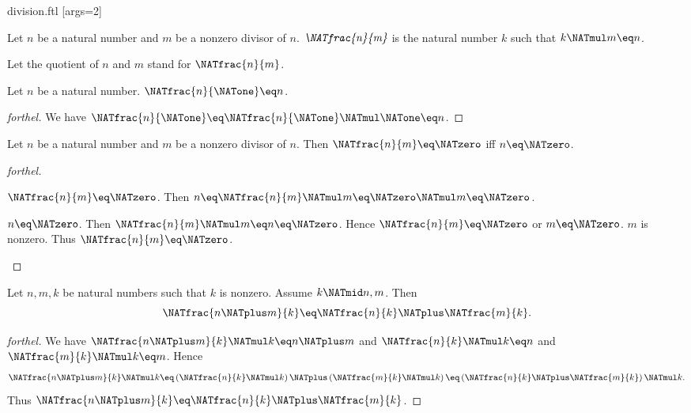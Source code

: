 \documentclass{naproche-library}
\begin{document}
\begin{smodule}[title=Division]{division.ftl}
[args=2]{}

\begin{definition}[forthel,id=ARITHMETIC_14_2313654268297915]
  Let $n$ be a natural number and $m$ be a nonzero divisor of $n$.
  $\emph{\NATfrac{n}{m}}$ is the natural number $k$ such that $k \NATmul m \eq n$.

  Let the quotient of $n$ and $m$ stand for $\NATfrac{n}{m}$.
\end{definition}

\begin{proposition}[forthel,id=ARITHMETIC_14_0843793254698710]
  Let $n$ be a natural number.
  $\NATfrac{n}{\NATone} \eq n$.
\end{proposition}
\begin{proof}[forthel]
  We have $\NATfrac{n}{\NATone}
    \eq \NATfrac{n}{\NATone} \NATmul \NATone
    \eq n$.
\end{proof}

\begin{proposition}[forthel,id=ARITHMETIC_14_1254235698632545]
  Let $n$ be a natural number and $m$ be a nonzero divisor of $n$.
  Then $\NATfrac{n}{m} \eq \NATzero$ iff $n \eq \NATzero$.
\end{proposition}
\begin{proof}[forthel]
  \begin{case}{$\NATfrac{n}{m} \eq \NATzero$.}
    Then $n
      \eq \NATfrac{n}{m} \NATmul m
      \eq \NATzero \NATmul m
      \eq \NATzero$.
  \end{case}

  \begin{case}{$n \eq \NATzero$.}
    Then $\NATfrac{n}{m} \NATmul m
      \eq n
      \eq \NATzero$.
    Hence $\NATfrac{n}{m} \eq \NATzero$ or $m \eq \NATzero$.
    $m$ is nonzero.
    Thus $\NATfrac{n}{m} \eq \NATzero$.
  \end{case}
\end{proof}

\begin{proposition}[forthel,id=ARITHMETIC_14_5137961454123875]
  Let $n, m, k$ be natural numbers such that $k$ is nonzero.
  Assume $k \NATmid n,m$.
  Then \[\NATfrac{n \NATplus m}{k} \eq \NATfrac{n}{k} \NATplus \NATfrac{m}{k}.\]
\end{proposition}
\begin{proof}[forthel]
  We have $\NATfrac{n \NATplus m}{k} \NATmul k \eq n \NATplus m$ and $\NATfrac{n}{k} \NATmul k \eq n$ and $\NATfrac{m}{k} \NATmul k \eq m$.
  Hence
  \[  \NATfrac{n \NATplus m}{k} \NATmul k
      \eq \left( \NATfrac{n}{k} \NATmul k \right) \NATplus \left( \NATfrac{m}{k} \NATmul k \right)
      \eq \left( \NATfrac{n}{k} \NATplus \NATfrac{m}{k} \right) \NATmul k. \]
  Thus $\NATfrac{n \NATplus m}{k} \eq \NATfrac{n}{k} \NATplus \NATfrac{m}{k}$.
\end{proof}


\end{smodule}
\end{document}
